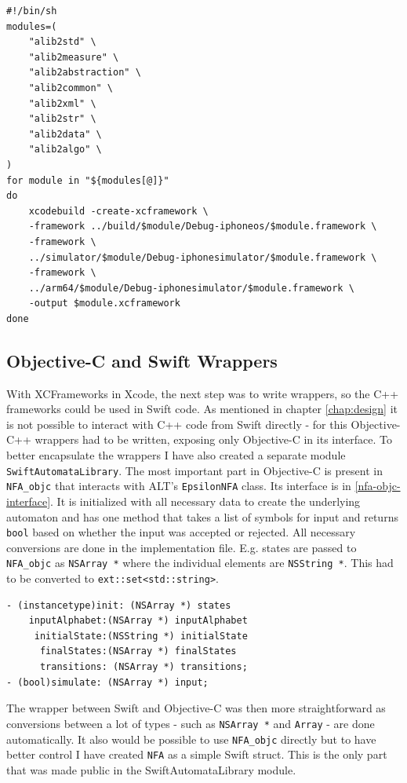 \begin{lstlisting}[caption=XCFramework shell script, label=xcframework-bundle]
#!/bin/sh
modules=(
    "alib2std" \
    "alib2measure" \
    "alib2abstraction" \
    "alib2common" \
    "alib2xml" \
    "alib2str" \
    "alib2data" \
    "alib2algo" \
)
for module in "${modules[@]}"
do
    xcodebuild -create-xcframework \
    -framework ../build/$module/Debug-iphoneos/$module.framework \
    -framework \
    ../simulator/$module/Debug-iphonesimulator/$module.framework \
    -framework \
    ../arm64/$module/Debug-iphonesimulator/$module.framework \
    -output $module.xcframework
done
\end{lstlisting}

\subsection{Objective-C and Swift Wrappers}

With XCFrameworks in Xcode, the next step was to write wrappers, so the C++ frameworks could be used in Swift code. As mentioned in chapter \ref{chap:design} it is not possible to interact with C++ code from Swift directly - for this Objective-C++ wrappers had to be written, exposing only Objective-C in its interface. To better encapsulate the wrappers I have also created a separate module \lstinline{SwiftAutomataLibrary}. The most important part in Objective-C is present in \lstinline{NFA_objc} that interacts with ALT's \lstinline{EpsilonNFA} class. Its interface is in \ref{nfa-objc-interface}. It is initialized with all necessary data to create the underlying automaton and has one method that takes a list of symbols for input and returns \lstinline{bool} based on whether the input was accepted or rejected. All necessary conversions are done in the implementation file. E.g. states are passed to \lstinline{NFA_objc} as \lstinline{NSArray *} where the individual elements are \lstinline{NSString *}. This had to be converted to \lstinline{ext::set<std::string>}.

\begin{lstlisting}[caption={NFA\_objc interface}, label=nfa-objc-interface]
- (instancetype)init: (NSArray *) states
    inputAlphabet:(NSArray *) inputAlphabet
     initialState:(NSString *) initialState
      finalStates:(NSArray *) finalStates
      transitions: (NSArray *) transitions;
- (bool)simulate: (NSArray *) input;
\end{lstlisting}

The wrapper between Swift and Objective-C was then more straightforward as conversions between a lot of types - such as \lstinline{NSArray *} and \lstinline{Array} - are done automatically. It also would be possible to use \lstinline{NFA_objc} directly but to have better control I have created \lstinline{NFA} as a simple Swift struct. This is the only part that was made public in the SwiftAutomataLibrary module.

